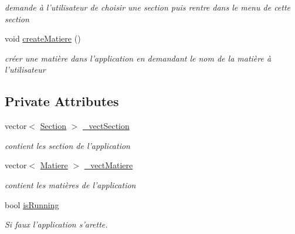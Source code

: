\begin{DoxyCompactItemize}
\begin{DoxyCompactList}\small\item\em demande à l'utilisateur de choisir une section puis rentre dans le menu de cette section \end{DoxyCompactList}\item 
\hypertarget{class_application_ad3926f6b73edf14c855a5d9ca0def19d}{void \hyperlink{class_application_ad3926f6b73edf14c855a5d9ca0def19d}{create\-Matiere} ()}\label{class_application_ad3926f6b73edf14c855a5d9ca0def19d}

\begin{DoxyCompactList}\small\item\em créer une matière dans l'application en demandant le nom de la matière à l'utilisateur \end{DoxyCompactList}\end{DoxyCompactItemize}
\subsection*{Private Attributes}
\begin{DoxyCompactItemize}
\item 
\hypertarget{class_application_adacae6cc3c6f512d6d4438410f715f96}{vector$<$ \hyperlink{class_section}{Section} $>$ \hyperlink{class_application_adacae6cc3c6f512d6d4438410f715f96}{\-\_\-vect\-Section}}\label{class_application_adacae6cc3c6f512d6d4438410f715f96}

\begin{DoxyCompactList}\small\item\em contient les section de l'application \end{DoxyCompactList}\item 
\hypertarget{class_application_a55bcc1a609df7cdbed974290d404c04b}{vector$<$ \hyperlink{class_matiere}{Matiere} $>$ \hyperlink{class_application_a55bcc1a609df7cdbed974290d404c04b}{\-\_\-vect\-Matiere}}\label{class_application_a55bcc1a609df7cdbed974290d404c04b}

\begin{DoxyCompactList}\small\item\em contient les matières de l'application \end{DoxyCompactList}\item 
\hypertarget{class_application_ae1c1ff7a7663d9baa9b65a7ba8e1dcf8}{bool \hyperlink{class_application_ae1c1ff7a7663d9baa9b65a7ba8e1dcf8}{is\-Running}}\label{class_application_ae1c1ff7a7663d9baa9b65a7ba8e1dcf8}

\begin{DoxyCompactList}\small\item\em Si faux l'application s'arette. \end{DoxyCompactList}\end{DoxyCompactItemize}


